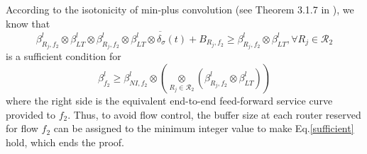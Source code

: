 \documentclass[preprint]{elsarticle}
\begin{document}
\begin{pf}
According to the isotonicity of min-plus convolution (see Theorem 3.1.7 in \cite{Boudec2001Network}), we know that
\begin{equation}\label{sufficient}
\beta_{R_j,f_2}^l\otimes\beta_{LT}^l\otimes\overline{\beta_{R_j,f_2}^l\otimes\beta_{LT}^l\otimes\delta_\sigma(t)+B_{R_j,f_2}}\geq\beta_{R_j,f_2}^l\otimes\beta_{LT}^l,\forall R_j\in\mathcal{R}_2
\end{equation}
is a sufficient condition for
$$\beta_{f_2}^l\geq\beta_{NI,f_2}^l\otimes(\underset{R_j\in\mathcal{R}_2}{\otimes}(\beta^l_{R_j,f_2}\otimes\beta_{LT}^l))$$ where the right side is the equivalent end-to-end feed-forward service curve provided to $f_2$. Thus, to avoid flow control, the buffer size at each router reserved for flow $f_2$ can be assigned to the minimum integer value to make Eq.\ref{sufficient} hold, which ends the proof.
\end{pf}
\end{document}
